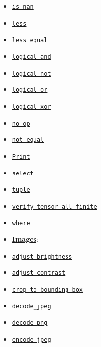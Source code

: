 \begin{itemize}
\item
  \href{../../api_docs/python/control_flow_ops.md\#is_nan}{\texttt{is\_nan}}
\item
  \href{../../api_docs/python/control_flow_ops.md\#less}{\texttt{less}}
\item
  \href{../../api_docs/python/control_flow_ops.md\#less_equal}{\texttt{less\_equal}}
\item
  \href{../../api_docs/python/control_flow_ops.md\#logical_and}{\texttt{logical\_and}}
\item
  \href{../../api_docs/python/control_flow_ops.md\#logical_not}{\texttt{logical\_not}}
\item
  \href{../../api_docs/python/control_flow_ops.md\#logical_or}{\texttt{logical\_or}}
\item
  \href{../../api_docs/python/control_flow_ops.md\#logical_xor}{\texttt{logical\_xor}}
\item
  \href{../../api_docs/python/control_flow_ops.md\#no_op}{\texttt{no\_op}}
\item
  \href{../../api_docs/python/control_flow_ops.md\#not_equal}{\texttt{not\_equal}}
\item
  \href{../../api_docs/python/control_flow_ops.md\#Print}{\texttt{Print}}
\item
  \href{../../api_docs/python/control_flow_ops.md\#select}{\texttt{select}}
\item
  \href{../../api_docs/python/control_flow_ops.md\#tuple}{\texttt{tuple}}
\item
  \href{../../api_docs/python/control_flow_ops.md\#verify_tensor_all_finite}{\texttt{verify\_tensor\_all\_finite}}
\item
  \href{../../api_docs/python/control_flow_ops.md\#where}{\texttt{where}}
\item
  \textbf{\href{../../api_docs/python/image.md}{Images}}:
\item
  \href{../../api_docs/python/image.md\#adjust_brightness}{\texttt{adjust\_brightness}}
\item
  \href{../../api_docs/python/image.md\#adjust_contrast}{\texttt{adjust\_contrast}}
\item
  \href{../../api_docs/python/image.md\#crop_to_bounding_box}{\texttt{crop\_to\_bounding\_box}}
\item
  \href{../../api_docs/python/image.md\#decode_jpeg}{\texttt{decode\_jpeg}}
\item
  \href{../../api_docs/python/image.md\#decode_png}{\texttt{decode\_png}}
\item
  \href{../../api_docs/python/image.md\#encode_jpeg}{\texttt{encode\_jpeg}}

\end{itemize}
